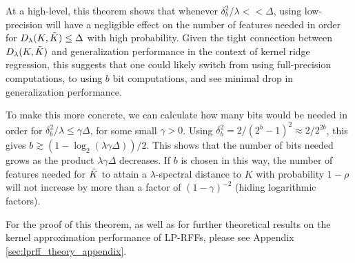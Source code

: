 At a high-level, this theorem shows that whenever $\delta_b^2/\lambda << \Delta$, using low-precision will have a negligible effect on the number of features needed in order for $D_{\lambda}(K,\tilde{K}) \leq \Delta$ with high probability.  Given the tight connection between $D_{\lambda}(K,\tilde{K})$ and generalization performance in the context of kernel ridge regression, this suggests that one could likely switch from using full-precision computations, to using $b$ bit computations, and see minimal drop in generalization performance.

To make this more concrete, we can calculate how many bits would be needed in order for $\delta^2_b/\lambda \leq \gamma\Delta$, for some small $\gamma > 0$. Using $\delta_b^2 = 2/(2^b-1)^2 \approx 2/2^{2b}$, this gives $b \gtrsim (1-\log_2(\lambda \gamma \Delta))/2$.  This shows that the number of bits needed grows as the product $\lambda \gamma \Delta$ decreases.  If $b$ is chosen in this way, the number of features needed for $\tilde{K}$ to attain a $\lambda$-spectral distance to $K$ with probability $1-\rho$ will not increase by more than a factor of $(1-\gamma)^{-2}$ (hiding logarithmic factors). 


For the proof of this theorem, as well as for further theoretical results on the kernel approximation performance of LP-RFFs, please see Appendix \ref{sec:lprff_theory_appendix}.
